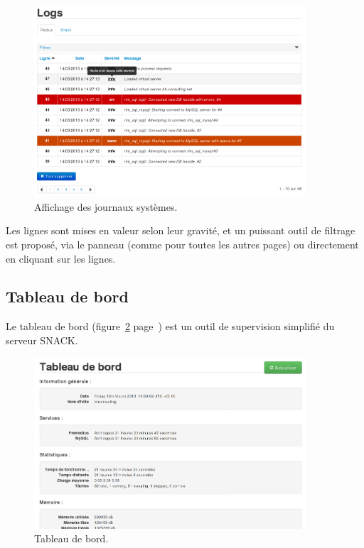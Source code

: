 \begin{figure}[!h]
	\begin{center}
	    \includegraphics[width=0.9\textwidth]{img/logs.png}
	\end{center}
	\caption{Affichage des journaux systèmes.}
	\label{logs}
\end{figure}

Les lignes sont mises en valeur selon leur gravité, et un puissant outil de filtrage est proposé, via le panneau (comme pour toutes les autres pages) ou directement en cliquant sur les lignes.

\subsection{Tableau de bord}

Le tableau de bord (figure~\ref{dashboard} page~\pageref{dashboard}) est un outil de supervision simplifié du serveur SNACK.

\begin{figure}[!h]
	\begin{center}
	    \includegraphics[width=0.9\textwidth]{img/dashboard.png}
	\end{center}
	\caption{Tableau de bord.}
	\label{dashboard}
\end{figure}


